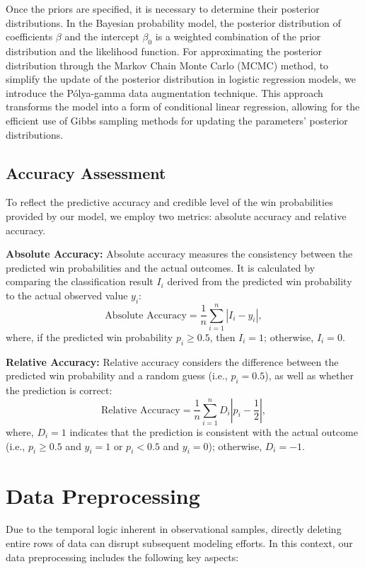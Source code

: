 \documentclass{mcmthesis}
\begin{document}
Once the priors are specified, it is necessary to determine their posterior distributions. In the Bayesian probability model, the posterior distribution of coefficients $\beta$ and the intercept $\beta_0$ is a weighted combination of the prior distribution and the likelihood function. For approximating the posterior distribution through the Markov Chain Monte Carlo (MCMC) method, to simplify the update of the posterior distribution in logistic regression models, we introduce the Pólya-gamma data augmentation technique. This approach transforms the model into a form of conditional linear regression, allowing for the efficient use of Gibbs sampling methods for updating the parameters' posterior distributions.


\subsection{Accuracy Assessment}

To reflect the predictive accuracy and credible level of the win probabilities provided by our model, we employ two metrics: absolute accuracy and relative accuracy.

\textbf{Absolute Accuracy:}
Absolute accuracy measures the consistency between the predicted win probabilities and the actual outcomes. It is calculated by comparing the classification result $I_i$ derived from the predicted win probability to the actual observed value $y_i$:
$$
\text{Absolute Accuracy} = \frac{1}{n} \sum_{i=1}^{n} |I_i - y_i|,
$$
where, if the predicted win probability $p_i \geq 0.5$, then $I_i = 1$; otherwise, $I_i = 0$.

\textbf{Relative Accuracy:}
Relative accuracy considers the difference between the predicted win probability and a random guess (i.e., $p_i = 0.5$), as well as whether the prediction is correct:
$$
\text{Relative Accuracy} = \frac{1}{n} \sum_{i=1}^{n} D_i |p_i - \frac{1}{2}|,
$$
where, $D_i = 1$ indicates that the prediction is consistent with the actual outcome (i.e., $p_i \geq 0.5$ and $y_i = 1$ or $p_i < 0.5$ and $y_i = 0$); otherwise, $D_i = -1$.

\section{Data Preprocessing}
Due to the temporal logic inherent in observational samples, directly deleting entire rows of data can disrupt subsequent modeling efforts. In this context, our data preprocessing includes the following key aspects:
\end{document}
